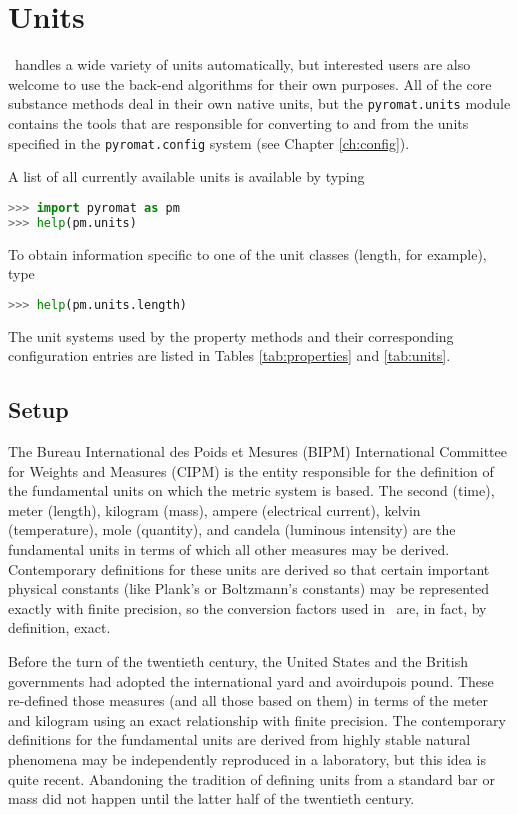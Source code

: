 \chapter{Units}\label{ch:units}

\PM\ handles a wide variety of units automatically, but interested users are also welcome to use the back-end algorithms for their own purposes.  All of the core substance methods deal in their own native units, but the \verb|pyromat.units| module contains the tools that are responsible for converting to and from the units specified in the \verb|pyromat.config| system (see Chapter \ref{ch:config}).

A list of all currently available units is available by typing
\begin{lstlisting}[language=Python]
>>> import pyromat as pm
>>> help(pm.units)
\end{lstlisting}
To obtain information specific to one of the unit classes (length, for example), type
\begin{lstlisting}[language=Python]
>>> help(pm.units.length)
\end{lstlisting}

The unit systems used by the property methods and their corresponding configuration entries are listed in Tables \ref{tab:properties} and \ref{tab:units}.  

\section{Setup}\label{sec:units:setup}

The Bureau International des Poids et Mesures (BIPM) International Committee for Weights and Measures (CIPM) is the entity responsible for the definition of the fundamental units on which the metric system is based.  The second (time), meter (length), kilogram (mass), ampere (electrical current), kelvin (temperature), mole (quantity), and candela (luminous intensity) are the fundamental units in terms of which all other measures may be derived.  Contemporary definitions for these units are derived so that certain important physical constants (like Plank's or Boltzmann's constants) may be represented exactly with finite precision, so the conversion factors used in \PM\ are, in fact, by definition, exact.

Before the turn of the twentieth century, the United States and the British governments had adopted the international yard and avoirdupois pound.  These re-defined those measures (and all those based on them) in terms of the meter and kilogram using an exact relationship with finite precision.  The contemporary definitions for the fundamental units are derived from highly stable natural phenomena may be independently reproduced in a laboratory, but this idea is quite recent.  Abandoning the tradition of defining units from a standard bar or mass did not happen until the latter half of the twentieth century. \cite{nbs:sp447}

